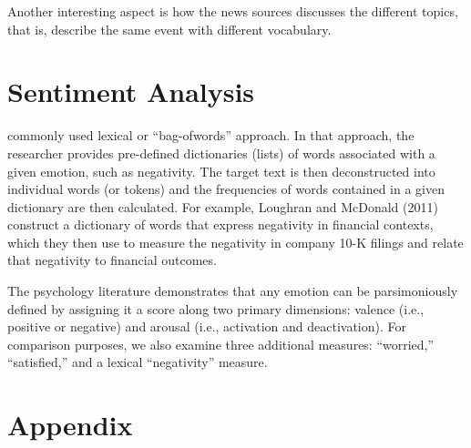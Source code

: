 \documentclass[12pt,a4paper,notitlepage]{article}
\begin{document}
Another interesting aspect is how the news sources discusses the different topics, that is, describe the same event with different vocabulary.

\section{Sentiment Analysis}

commonly used lexical or “bag-ofwords” approach. In that approach, the researcher provides pre-defined dictionaries (lists) of words associated with a given emotion, such as negativity. The target text is then deconstructed into individual words (or tokens) and the frequencies of words contained in a given dictionary are then calculated. For example, Loughran and McDonald (2011) construct a dictionary of words that express negativity in financial contexts, which they then use to measure the negativity in company 10-K filings and relate that negativity to financial outcomes.

The psychology literature demonstrates that any emotion can be parsimoniously defined by assigning it a score along two primary dimensions: valence (i.e., positive or negative) and arousal (i.e., activation and deactivation). For comparison purposes, we also examine three additional measures: “worried,” “satisfied,” and a lexical “negativity” measure. 

\section*{Appendix}
\end{document}
